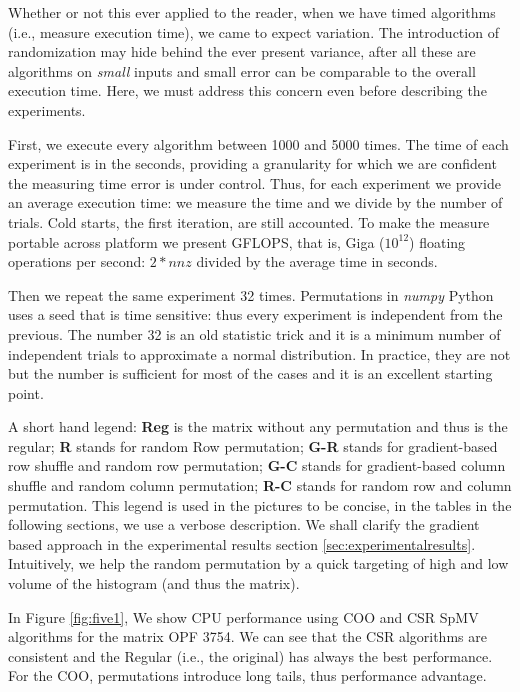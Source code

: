 \documentclass[manuscript,screen]{acmart}
\begin{document}
Whether or not this ever applied to the reader, when we have timed
algorithms (i.e., measure execution time), we came to expect
variation.  The introduction of randomization may hide behind the ever
present variance, after all these are algorithms on {\em small} inputs
and small error can be comparable to the overall execution time. Here,
we must address this concern even before describing the experiments.

First, we execute every algorithm between 1000 and 5000 times. The
time of each experiment is in the seconds, providing a granularity for
which we are confident the measuring time error is under
control. Thus, for each experiment we provide an average execution
time: we measure the time and we divide by the number of trials. Cold
starts, the first iteration, are still accounted. To make the measure
portable across platform we present GFLOPS, that is, Giga ($10^{12}$)
floating operations per second: $2*nnz$ divided by the average time in
seconds.

Then we repeat the same experiment 32 times. Permutations in {\em
  numpy} Python uses a seed that is time sensitive: thus every
experiment is independent from the previous. The number 32 is an old
statistic trick and it is a minimum number of independent trials to
approximate a normal distribution. In practice, they are not but the
number is sufficient for most of the cases and it is an excellent
starting point.

A short hand legend: {\bf Reg} is the matrix without any permutation
and thus is the regular; {\bf R} stands for random Row permutation;
{\bf G-R} stands for gradient-based row shuffle and random row
permutation; {\bf G-C} stands for gradient-based column shuffle and
random column permutation; {\bf R-C} stands for random row and column
permutation.  This legend is used in the pictures to be concise, in
the tables in the following sections, we use a verbose description. We
shall clarify the gradient based approach in the experimental results
section \ref{sec:experimentalresults}. Intuitively, we help the random
permutation by a quick targeting of high and low volume of the
histogram (and thus the matrix).


In Figure \ref{fig:five1}, We show CPU performance using COO and CSR
SpMV algorithms for the matrix OPF 3754. We can see that the CSR
algorithms are consistent and the Regular (i.e., the original) has
always the best performance. For the COO, permutations introduce long
tails, thus performance advantage. 
\end{document}
